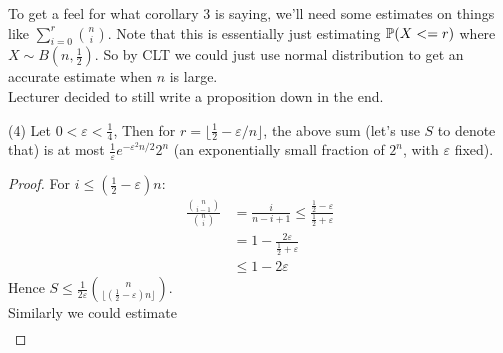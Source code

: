 \documentclass[a4paper]{article}
\begin{document}
To get a feel for what corollary 3 is saying, we'll need some estimates on things like $\sum_{i=0}^r {n\choose i}$. Note that this is essentially just estimating $\P(X<=r)$ where $X \sim B(n,\frac{1}{2})$. So by CLT we could just use normal distribution to get an accurate estimate when $n$ is large.\\
Lecturer decided to still write a proposition down in the end.

\begin{prop} (4)
    Let $0 < \varepsilon < \frac{1}{4}$, Then for $r=\lfloor \frac{1}{2} -\varepsilon/n\rfloor$, the above sum (let's use $S$ to denote that) is at most $\frac{1}{\varepsilon} e^{-\varepsilon^2 n/2} 2^n$ (an exponentially small fraction of $2^n$, with $\varepsilon$ fixed).\\
    \begin{proof}
    For $i \leq (\frac{1}{2} - \varepsilon) n$:
    \begin{equation*}
        \begin{aligned}
            \frac{{n \choose {i-1}}}{{n \choose i}} &= \frac{i}{n-i+1} \leq \frac{\frac{1}{2}-\varepsilon}{\frac{1}{2}+\varepsilon}\\
            &= 1-\frac{2\varepsilon}{\frac{1}{2}+\varepsilon}\\
            &\leq 1-2\varepsilon
        \end{aligned}
    \end{equation*}
    Hence $S \leq \frac{1}{2\varepsilon}{n \choose {\lfloor (\frac{1}{2}-\varepsilon) n \rfloor}}$.\\
    Similarly we could estimate
    \begin{equation*}
        \begin{aligned}

        \end{aligned}
    \end{equation*}
\end{proof}
\end{prop}
\end{document}
